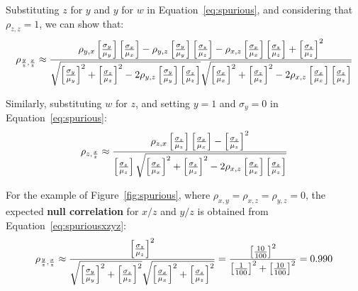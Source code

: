 \begin{enumerate}
Substituting $z$ for $y$ and $y$ for $w$ in
Equation~\ref{eq:spurious}, and considering that $\rho_{z,z}=1$, we
can show that:
\begin{equation}
  \noindent \rho_{\frac{y}{z},\frac{x}{z}} \approx
  \frac{\rho_{y,x}\left[\frac{\sigma_y}{\mu_y}\right]
    \left[\frac{\sigma_x}{\mu_x}\right] -
    \rho_{y,z}\left[\frac{\sigma_y}{\mu_y}\right]
    \left[\frac{\sigma_z}{\mu_z}\right] -
    \rho_{x,z}\left[\frac{\sigma_x}{\mu_x}\right]
    \left[\frac{\sigma_z}{\mu_z}\right] +
    \left[\frac{\sigma_z}{\mu_z}\right]^2
  }{
    \sqrt{\left[\frac{\sigma_y}{\mu_y}\right]^2 +
      \left[\frac{\sigma_z}{\mu_z}\right]^2 -
      2 \rho_{y,z}\left[\frac{\sigma_y}{\mu_y}\right]
      \left[\frac{\sigma_z}{\mu_z}\right]}
    \sqrt{\left[\frac{\sigma_x}{\mu_x}\right]^2 +
      \left[\frac{\sigma_z}{\mu_z}\right]^2 -
      2 \rho_{x,z}\left[\frac{\sigma_x}{\mu_x}\right]
      \left[\frac{\sigma_z}{\mu_z}\right]
    }
  }
  \label{eq:spuriousxzyz}
\end{equation}

Similarly, substituting $w$ for $z$, and setting $y=1$ and
$\sigma_y=0$ in Equation~\ref{eq:spurious}:
\begin{equation}
  \noindent \rho_{z,\frac{x}{z}} \approx
  \frac{\rho_{z,x}\left[\frac{\sigma_z}{\mu_z}\right]
    \left[\frac{\sigma_x}{\mu_x}\right] -
    \left[\frac{\sigma_z}{\mu_z}\right]^2
  }{
    \left[\frac{\sigma_z}{\mu_z}\right]
    \sqrt{\left[\frac{\sigma_x}{\mu_x}\right]^2 +
      \left[\frac{\sigma_z}{\mu_z}\right]^2 -
      2 \rho_{x,z}\left[\frac{\sigma_x}{\mu_x}\right]
      \left[\frac{\sigma_z}{\mu_z}\right]
    }
  }
  \label{eq:spuriouszxz}
\end{equation}

For the example of Figure~\ref{fig:spurious}, where
$\rho_{x,y}=\rho_{x,z}=\rho_{y,z}=0$, the expected \textbf{null
  correlation} for $x/z$ and $y/z$ is obtained from
Equation~\ref{eq:spuriousxzyz}:
\begin{equation}
  \noindent \rho_{\frac{y}{z},\frac{x}{z}} \approx
  \frac{
    \left[\frac{\sigma_z}{\mu_z}\right]^2
  }{
    \sqrt{\left[\frac{\sigma_y}{\mu_y}\right]^2 +
      \left[\frac{\sigma_z}{\mu_z}\right]^2}
    \sqrt{\left[\frac{\sigma_x}{\mu_x}\right]^2 +
      \left[\frac{\sigma_z}{\mu_z}\right]^2}
  }
  =
  \frac{
    \left[\frac{10}{100}\right]^2
  }{
    \left[\frac{1}{100}\right]^2 +
      \left[\frac{10}{100}\right]^2
  }
  = 0.990
  \label{eq:spuriousxzyzindepxyz}
\end{equation}


\end{enumerate}
